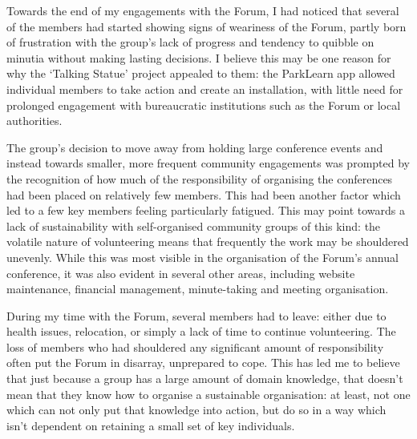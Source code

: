Towards the end of my engagements with the Forum, I had noticed that several of the members had started showing signs of weariness of the Forum, partly born of frustration with the group's lack of progress and tendency to quibble on minutia without making lasting decisions. I believe this may be one reason for why the `Talking Statue' project appealed to them: the ParkLearn app allowed individual members to take action and create an installation, with little need for prolonged engagement with bureaucratic institutions such as the Forum or local authorities.

The group's decision to move away from holding large conference events and instead towards smaller, more frequent community engagements was prompted by the recognition of how much of the responsibility of organising the conferences had been placed on relatively few members. This had been another factor which led to a few key members feeling particularly fatigued. This may point towards a lack of sustainability with self-organised community groups of this kind: the volatile nature of volunteering means that frequently the work may be shouldered unevenly. While this was most visible in the organisation of the Forum's annual conference, it was also evident in several other areas, including website maintenance, financial management, minute-taking and meeting organisation. 

During my time with the Forum, several members had to leave: either due to health issues, relocation, or simply a lack of time to continue volunteering. The loss of members who had shouldered any significant amount of responsibility often put the Forum in disarray, unprepared to cope. This has led me to believe that just because a group has a large amount of domain knowledge, that doesn't mean that they know how to organise a sustainable organisation: at least, not one which can not only put that knowledge into action, but do so in a way which isn't dependent on retaining a small set of key individuals.

